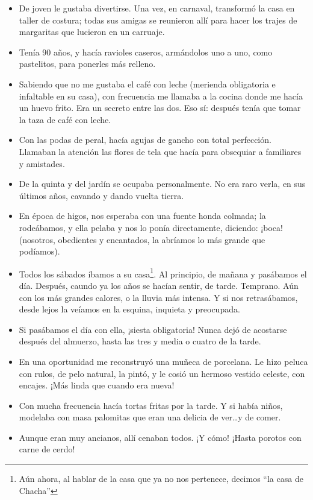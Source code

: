 \documentclass[a4paper]{article}
\begin{document}
\begin{itemize}
    \item{De joven le gustaba divertirse. Una vez, en carnaval, transformó la casa en taller de costura; todas sus amigas se reunieron allí para hacer los trajes de margaritas que lucieron en un carruaje.}
    \item{Tenía 90 años, y hacía ravioles caseros, armándolos uno a uno, como pastelitos, para ponerles más relleno.}
    \item{Sabiendo que no me gustaba el café con leche (merienda obligatoria e infaltable en su casa), con frecuencia me llamaba a la cocina donde me hacía un huevo frito. Era un secreto entre las dos. Eso sí: después tenía que tomar la taza de café con leche.}
    \item{Con las podas de peral, hacía agujas de gancho con total perfección. Llamaban la atención las flores de tela que hacía para obsequiar a familiares y amistades.}
    \item{De la quinta y del jardín se ocupaba personalmente. No era raro verla, en sus últimos años, cavando y dando vuelta tierra.}
    \item{En época de higos, nos esperaba con una fuente honda colmada; la rodeábamos, y ella pelaba y nos lo ponía directamente, diciendo: ¡boca! (nosotros, obedientes y encantados, la abríamos lo más grande que podíamos).}
    \item{Todos los sábados íbamos a su casa\footnote{Aún ahora, al hablar de la casa que ya no nos pertenece, decimos ``la casa de Chacha''}. Al principio, de mañana y pasábamos el día. Después, caundo ya los años se hacían sentir, de tarde. Temprano. Aún con los más grandes calores, o la lluvia más intensa. Y si nos retrasábamos, desde lejos la veíamos en la esquina, inquieta y preocupada.}
    \item{Si pasábamos el día con ella, ¡siesta obligatoria! Nunca dejó de acostarse después del almuerzo, hasta las tres y media o cuatro de la tarde.}
    \item{En una oportunidad me reconstruyó una muñeca de porcelana. Le hizo peluca con rulos, de pelo natural, la pintó, y le cosió un hermoso vestido celeste, con encajes. ¡Más linda que cuando era nueva!}
    \item{Con mucha frecuencia hacía tortas fritas por la tarde. Y si había niños, modelaba con masa palomitas que eran una delicia de ver\ldots y de comer.}
    \item{Aunque eran muy ancianos, allí cenaban todos. ¡Y cómo! ¡Hasta porotos con carne de cerdo!}
\end{itemize}
\end{document}
